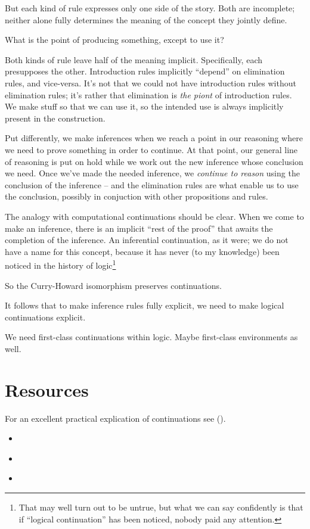 But each kind of rule expresses only one side of the story. Both are
incomplete; neither alone fully determines the meaning of the concept they
jointly define.

What is the point of producing something, except to use it?

Both kinds of rule leave half of the meaning implicit. Specifically,
each presupposes the other. Introduction rules implicitly ``depend''
on elimination rules, and vice-versa. It's not that we could not have
introduction rules without elimination rules; it's rather that
elimination is \textit{the piont} of introduction rules. We make stuff
so that we can use it, so the intended use is always implicitly
present in the construction.

Put differently, we make inferences when we reach a point in our
reasoning where we need to prove something in order to continue. At
that point, our general line of reasoning is put on hold while we work
out the new inference whose conclusion we need. Once we've made the
needed inference, we \textit{continue to reason} using the conclusion
of the inference -- and the elimination rules are what enable us to
use the conclusion, possibly in conjuction with other propositions and
rules.

The analogy with computational continuations should be clear. When we
come to make an inference, there is an implicit ``rest of the proof''
that awaits the completion of the inference. An inferential
continuation, as it were; we do not have a name for this concept,
because it has never (to my knowledge) been noticed in the history of
logic\footnote{That may well turn out to be untrue, but what we can
say confidently is that if ``logical continuation'' has been noticed,
nobody paid any attention.}

So the Curry-Howard isomorphism preserves continuations.

It follows that to make inference rules fully explicit, we need to make logical continuations explicit.

We need first-class continuations within logic. Maybe first-class
environments as well.




\section{Resources}

For an excellent practical explication of continuations see  (\cite{queinnec2003lisp}).

\begin{itemize}
\item {} \cite{Strachey2000ContinuationsAM}
\item {} \cite{discovery_continuations}
\item {} \cite{10.1145/62678.62684}
\end{itemize}

